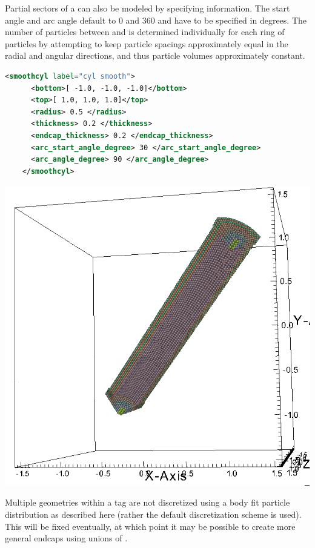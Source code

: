 \begin{minipage}{0.6\textwidth}
  Partial sectors of a  can also be modeled by specifying 
  information.  The start angle and arc angle default to 0 and 360 and have to be specified
  in degrees.
  The number of particles between  and 
  is determined individually for each ring of particles by
  attempting to keep particle spacings approximately equal in the radial
  and angular directions, and thus particle volumes approximately
  constant.
  \begin{lstlisting}[language=XML]
    <smoothcyl label="cyl smooth">
      <bottom>[ -1.0, -1.0, -1.0]</bottom>
      <top>[ 1.0, 1.0, 1.0]</top>
      <radius> 0.5 </radius>
      <thickness> 0.2 </thickness>
      <endcap_thickness> 0.2 </endcap_thickness>
      <arc_start_angle_degree> 30 </arc_start_angle_degree>
      <arc_angle_degree> 90 </arc_angle_degree>
    </smoothcyl>
  \end{lstlisting}
\end{minipage}
\begin{minipage}{0.4\textwidth}
  \centering
  \includegraphics[width=0.9\columnwidth]{FIGS/geometry/geom_smooth_cyl_hollow_endcap_arc.png}
\end{minipage}

\begin{NoteBox}
Multiple  geometries within a  
tag are not
discretized using a body fit particle distribution as described here
(rather the default discretization scheme is used).  This will be
fixed eventually, at which point it may be possible to create more
general endcaps using unions of .
\end{NoteBox}


